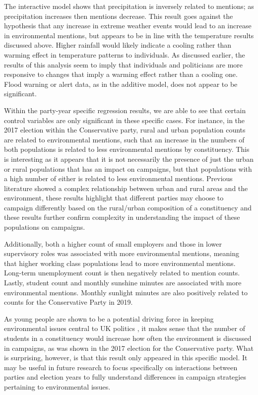 \documentclass[12pt,letterpaper]{article}
\begin{document}
The interactive model shows that precipitation is inversely related to mentions; as precipitation increases then mentions decrease. This result goes against the hypothesis that any increase in extreme weather events would lead to an increase in environmental mentions, but appears to be in line with the temperature results discussed above. Higher rainfall would likely indicate a cooling rather than warming effect in temperature patterns to individuals. As discussed earlier, the results of this analysis seem to imply that individuals and politicians are more responsive to changes that imply a warming effect rather than a cooling one. Flood warning or alert data, as in the additive model, does not appear to be significant.


Within the party-year specific regression results, we are able to see that certain control variables are only significant in these specific cases. For instance, in the 2017 election within the Conservative party, rural and urban population counts are related to environmental mentions, such that an increase in the numbers of both populations is related to less environmental mentions by constituency. This is interesting as it appears that it is not necessarily the presence of just the urban or rural populations that has an impact on campaigns, but that populations with a high number of either is related to less environmental mentions. Previous literature showed a complex relationship between urban and rural areas and the environment, these results highlight that different parties may choose to campaign differently based on the rural/urban composition of a constituency and these results further confirm complexity in understanding the impact of these populations on campaigns. 

Additionally, both a higher count of small employers and those in lower supervisory roles was associated with more environmental mentions, meaning that higher working class populations lead to more environmental mentions. Long-term unemployment count is then negatively related to mention counts. Lastly, student count and monthly sunshine minutes are associated with more environmental mentions. Monthly sunlight minutes are also positively related to counts for the Conservative Party in 2019.

As young people are shown to be a potential driving force in keeping environmental issues central to UK politics \autocite{burnsWillBrexitDegrade2020}, it makes sense that the number of students in a constituency would increase how often the environment is discussed in campaigns, as was shown in the 2017 election for the Conservative party. What is surprising, however, is that this result only appeared in this specific model. It may be useful in future research to focus specifically on interactions between parties and election years to fully understand differences in campaign strategies pertaining to environmental issues.
\end{document}
